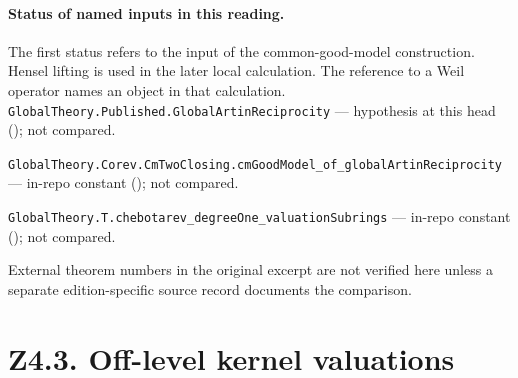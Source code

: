 
\paragraph{Status of named inputs in this reading.}
The first status refers to the input of the common-good-model construction. Hensel lifting is used in the later local calculation. The reference to a Weil operator names an object in that calculation.
\noindent\nolinkurl{GlobalTheory.Published.GlobalArtinReciprocity} --- hypothesis at this head (); not compared.\par
\noindent\nolinkurl{GlobalTheory.Corev.CmTwoClosing.cmGoodModel_of_globalArtinReciprocity} --- in-repo constant (); not compared.\par
\noindent\nolinkurl{GlobalTheory.T.chebotarev_degreeOne_valuationSubrings} --- in-repo constant (); not compared.\par
External theorem numbers in the original excerpt are not verified here unless a separate edition-specific source record documents the comparison.

\section*{Z4.3. Off-level kernel valuations}

